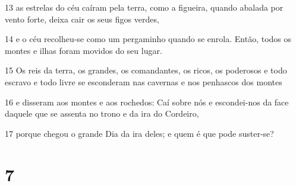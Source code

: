 \par 13 as estrelas do céu caíram pela terra, como a figueira, quando abalada por vento forte, deixa cair os seus figos verdes,
\par 14 e o céu recolheu-se como um pergaminho quando se enrola. Então, todos os montes e ilhas foram movidos do seu lugar.
\par 15 Os reis da terra, os grandes, os comandantes, os ricos, os poderosos e todo escravo e todo livre se esconderam nas cavernas e nos penhascos dos montes
\par 16 e disseram aos montes e aos rochedos: Caí sobre nós e escondei-nos da face daquele que se assenta no trono e da ira do Cordeiro,
\par 17 porque chegou o grande Dia da ira deles; e quem é que pode suster-se?

\chapter{7}


